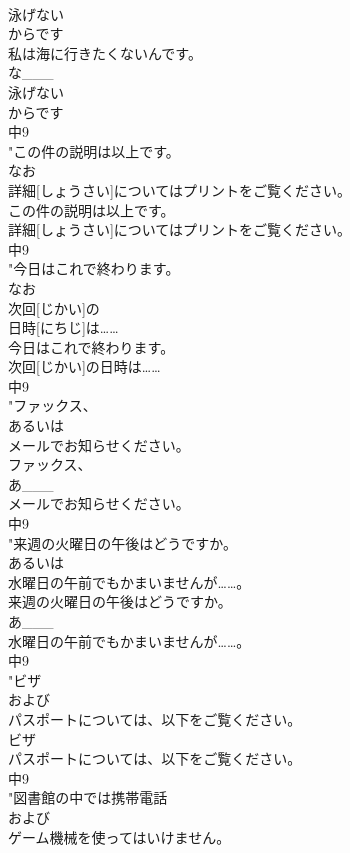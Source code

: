 \documentclass[8pt]{extreport}
\begin{document}
\begin{CJK}{UTF8}{min}
\\	泳げない
\\	からです
\\	私は海に行きたくないんです。
\\	な___
\\	泳げない
\\	からです
\\	中9
\\	"この件の説明は以上です。
\\	なお
\\	詳細[しょうさい]についてはプリントをご覧ください。
\\	この件の説明は以上です。
\\	詳細[しょうさい]についてはプリントをご覧ください。
\\	中9
\\	"今日はこれで終わります。
\\	なお
\\	次回[じかい]の
\\	日時[にちじ]は……
\\	今日はこれで終わります。
\\	次回[じかい]の日時は……
\\	中9
\\	"ファックス、
\\	あるいは
\\	メールでお知らせください。
\\	ファックス、
\\	あ___
\\	メールでお知らせください。
\\	中9
\\	"来週の火曜日の午後はどうですか。
\\	あるいは
\\	水曜日の午前でもかまいませんが……。
\\	来週の火曜日の午後はどうですか。
\\	あ___
\\	水曜日の午前でもかまいませんが……。
\\	中9
\\	"ビザ
\\	および
\\	パスポートについては、以下をご覧ください。
\\	ビザ
\\	パスポートについては、以下をご覧ください。
\\	中9
\\	"図書館の中では携帯電話
\\	および
\\	ゲーム機械を使ってはいけません。

\end{CJK}
\end{document}
